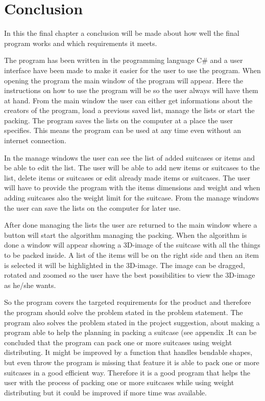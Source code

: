\chapter{Conclusion}
In this the final chapter a conclusion will be made about how well the final program works and which requirements it meets.

The program has been written in the programming language C\# and a user interface have been made to make it easier for the user to use the program. When opening the program the main window of the program will appear. Here the instructions on how to use the program will be so the user always will have them at hand. From the main window the user can either get informations about the creators of the program, load a previous saved list, manage the lists or start the packing. The program saves the lists on the computer at a place the user specifies. This means the program can be used at any time even without an internet connection. 

In the manage windows the user can see the list of added suitcases or items and be able to edit the list. The user will be able to add new items or suitcases to the list, delete items or suitcases or edit already made items or suitcases. The user will have to provide the program with the items dimensions and weight and when adding suitcases also the weight limit for the suitcase. From the manage windows the user can save the lists on the computer for later use. 

After done managing the lists the user are returned to the main window where a button will start the algorithm managing the packing. When the algorithm is done a window will appear showing a 3D-image of the suitcase with all the things to be packed inside. A list of the items will be on the right side and then an item is selected it will be highlighted in the 3D-image. The image can be dragged, rotated and zoomed so the user have the best possibilities to view the 3D-image as he/she wants.

So the program covers the targeted requirements for the product and therefore the program should solve the problem stated in the problem statement. The program also solves the problem stated in the project suggestion, about making a program able to help the planning in packing a suitcase (see appendix .It can be concluded that the program can pack one or more suitcases using weight distributing. It might be improved by a function that handles bendable shapes, but even throw the program is missing that feature it is able to pack one or more suitcases in a good efficient way. Therefore it is a good program that helps the user with the process of packing one or more suitcases while using weight distributing but it could be improved if more time was available. 
